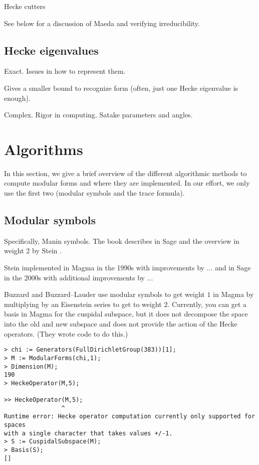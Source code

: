 \documentclass[11pt]{amsart}
\numberwithin{equation}{subsection}
\theoremstyle{plain}
\theoremstyle{definition}
\begin{document}
Hecke cutters

See below for a discussion of Maeda and verifying irreducibility.

\subsection{Hecke eigenvalues}

Exact.  Issues in how to represent them.

Gives a smaller bound to recognize form (often, just one Hecke eigenvalue is enough).

Complex.  Rigor in computing.  Satake parameters and angles.

\section{Algorithms}

In this section, we give a brief overview of the different algorithmic methods to compute modular forms and where they are implemented.  In our effort, we only use the first two (modular symbols and the trace formula).  

\subsection{Modular symbols}

Specifically, Manin symbols.  The book \cite{Stein} describes in Sage and the overview in weight 2 by Stein \cite{Stein2}.

Stein implemented in Magma in the 1990s with improvements by ...  and in Sage in the 2000s with additional improvements by ...

Buzzard and Buzzard--Lauder use modular symbols to get weight $1$ in Magma by multiplying by an Eisenstein series to get to weight $2$.  Currently, you can get a basis in Magma for the cuspidal subspace, but it does not decompose the space into the old and new subspace and does not provide the action of the Hecke operators.  (They wrote code to do this.)  

\begin{verbatim}
> chi := Generators(FullDirichletGroup(383))[1];
> M := ModularForms(chi,1);
> Dimension(M);
190
> HeckeOperator(M,5);

>> HeckeOperator(M,5);
                ^
Runtime error: Hecke operator computation currently only supported for spaces 
with a single character that takes values +/-1.
> S := CuspidalSubspace(M);
> Basis(S);
[]
\end{verbatim}
\end{document}
